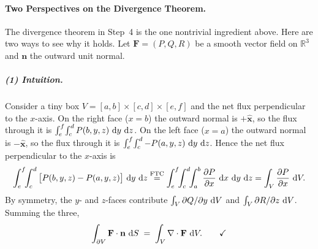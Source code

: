 \begin{nknote}
\paragraph{Two Perspectives on the Divergence Theorem.}
The divergence theorem in Step~4 is the one nontrivial ingredient above. Here are two ways to see why it holds. Let $\mathbf{F} = (P, Q, R)$ be a smooth vector field on $\mathbb{R}^3$ and $\mathbf{n}$ the outward unit normal.

\subparagraph{(1) Intuition.}
Consider a tiny box $V = [a,b]\times[c,d]\times[e,f]$ and the net flux perpendicular to the $x$-axis. On the right face ($x=b$) the outward normal is $+\hat{\mathbf{x}}$, so the flux through it is $\int_e^f\!\int_c^d P(b,y,z)\,\mathop{}\!\mathrm{d} y\,\mathop{}\!\mathrm{d} z$. On the left face ($x=a$) the outward normal is $-\hat{\mathbf{x}}$, so the flux through it is $\int_e^f\!\int_c^d -P(a,y,z)\,\mathop{}\!\mathrm{d} y\,\mathop{}\!\mathrm{d} z$. Hence the net flux perpendicular to the $x$-axis is
\[
\int_e^f\!\!\int_c^d \big[P(b,y,z) - P(a,y,z)\big]\,\diff y\,\diff z
\overset{\text{FTC}}{=}
\int_e^f\!\!\int_c^d\!\!\int_a^b \frac{\partial P}{\partial x}\,\diff x\,\diff y\,\diff z
= \int_V \frac{\partial P}{\partial x}\,\diff V .
\]
By symmetry, the $y$- and $z$-faces contribute $\int_V \partial Q/\partial y\,\mathop{}\!\mathrm{d} V$ and $\int_V \partial R/\partial z\,\mathop{}\!\mathrm{d} V$. Summing the three,
\[
\int_{\partial V} \mathbf{F}\cdot\mathbf{n}\,\mathop{}\!\mathrm{d} S \;=\; \int_V \nabla\cdot\mathbf{F}\,\mathop{}\!\mathrm{d} V. \qquad\checkmark
\]


\end{nknote}
